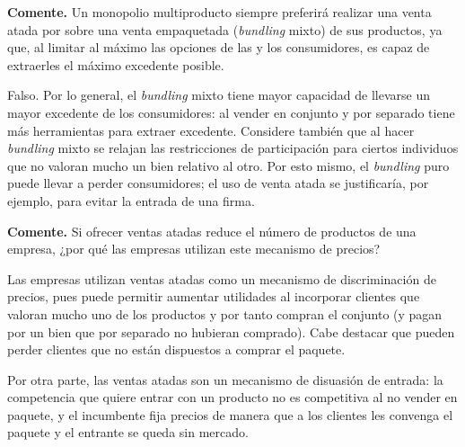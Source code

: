 \question \textbf{Comente.} Un monopolio multiproducto siempre preferirá realizar una venta atada por sobre una venta empaquetada (\emph{bundling} mixto) de sus productos, ya que, al limitar al máximo las opciones de las y los consumidores, es capaz de extraerles el máximo excedente posible.
\begin{solution}
Falso. Por lo general, el \emph{bundling} mixto tiene mayor capacidad de llevarse un mayor excedente de los consumidores: al vender en conjunto y por separado tiene más herramientas para extraer excedente. Considere también que al hacer \emph{bundling} mixto se relajan las restricciones de participación para ciertos individuos que no valoran mucho un bien relativo al otro. Por esto mismo, el \emph{bundling} puro puede llevar a perder consumidores; el uso de venta atada se justificaría, por ejemplo, para evitar la entrada de una firma.

\end{solution}

\question \textbf{Comente.} Si ofrecer ventas atadas reduce el número de productos de una empresa, ¿por qué las empresas utilizan este mecanismo de precios?
\begin{solution}
Las empresas utilizan ventas atadas como un mecanismo de discriminación de precios, pues puede permitir aumentar utilidades al incorporar clientes que valoran mucho uno de los productos y por tanto compran el conjunto (y pagan por un bien que por separado no hubieran comprado). Cabe destacar que pueden perder clientes que no están dispuestos a comprar el paquete.

Por otra parte, las ventas atadas son un mecanismo de disuasión de entrada: la competencia que quiere entrar con un producto no es competitiva al no vender en paquete, y el incumbente fija precios de manera que a los clientes les convenga el paquete y el entrante se queda sin mercado.

\end{solution}

